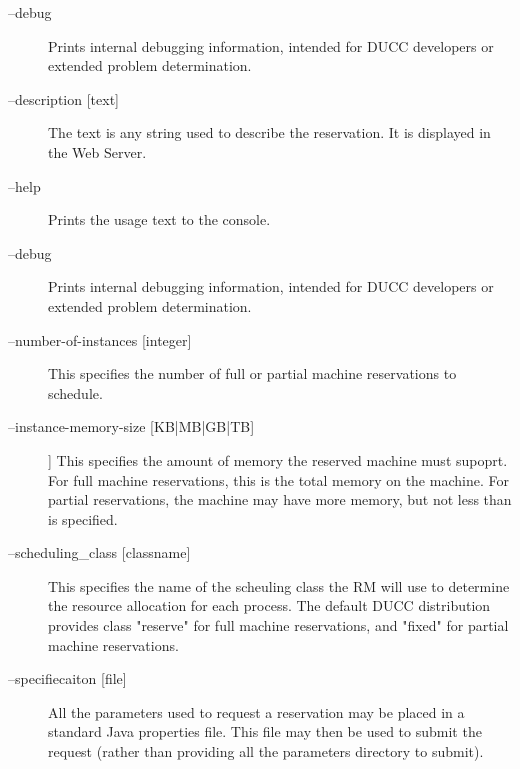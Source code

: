         \begin{description}

            \item[--debug ]          
              Prints internal debugging information, intended for DUCC developers or extended problem determination.
              
            \item[--description {[text]}]               
              The text is any string used to describe the reservation. It is displayed in the Web Server. 
              
            \item[--help ]             
              Prints the usage text to the console. 
              
            \item[--debug ]              
              Prints internal debugging information, intended for DUCC developers or extended problem determination.
              
            \item[--number-of-instances {[integer]}]               
              This specifies the number of full or partial machine reservations to schedule. 
              
            \item[--instance-memory-size {[KB|MB|GB|TB]}]]               
              This specifies the amount of memory the reserved machine must supoprt. For full machine 
              reservations, this is the total memory on the machine. For partial reservations, the machine 
              may have more memory, but not less than is specified. 
              
            \item[--scheduling\_class {[classname]}]               
              This specifies the name of the scheuling class the RM will use to determine the resource 
              allocation for each process. The default DUCC distribution provides class "reserve" for full 
              machine reservations, and "fixed" for partial machine reservations. 
              
            \item[--specifiecaiton {[file]}]               
              All the parameters used to request a reservation may be placed in a standard Java 
              properties file. This file may then be used to submit the request (rather than providing all 
              the parameters directory to submit). 

        \end{description}
            
